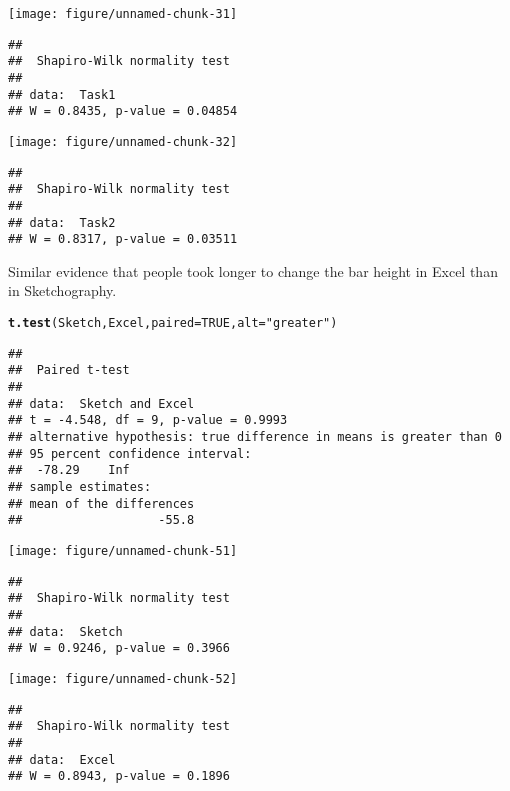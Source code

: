 \documentclass[12pt, twoside, a4paper, openright]{report}\usepackage[]{graphicx}\usepackage[]{color}
\makeatletter
\def\maxwidth{ %
  \ifdim\Gin@nat@width>\linewidth
    \linewidth
  \else
    \Gin@nat@width
  \fi
}
\newcommand{\hlnum}[1]{\textcolor[rgb]{0.686,0.059,0.569}{#1}}%
\newcommand{\hlstr}[1]{\textcolor[rgb]{0.192,0.494,0.8}{#1}}%
\newcommand{\hlstd}[1]{\textcolor[rgb]{0.345,0.345,0.345}{#1}}%
\newcommand{\hlkwc}[1]{\textcolor[rgb]{0.333,0.667,0.333}{#1}}%
\newcommand{\hlkwd}[1]{\textcolor[rgb]{0.737,0.353,0.396}{\textbf{#1}}}%
\newenvironment{kframe}{%
 \def\at@end@of@kframe{}%
 \ifinner\ifhmode%
  \def\at@end@of@kframe{\end{minipage}}%
  \begin{minipage}{\columnwidth}%
 \fi\fi%
 \def\FrameCommand##1{\hskip\@totalleftmargin \hskip-\fboxsep
 \colorbox{shadecolor}{##1}\hskip-\fboxsep
     \hskip-\linewidth \hskip-\@totalleftmargin \hskip\columnwidth}%
 \MakeFramed {\advance\hsize-\width
   \@totalleftmargin\z@ \linewidth\hsize
   \@setminipage}}%
 {\par\unskip\endMakeFramed%
 \at@end@of@kframe}
\newenvironment{knitrout}{}{} %
\makeatother
\begin{document}
\begin{knitrout}
\color{fgcolor}
\texttt{[image: figure/unnamed-chunk-31]} 
\begin{kframe}\begin{verbatim}
## 
## 	Shapiro-Wilk normality test
## 
## data:  Task1
## W = 0.8435, p-value = 0.04854
\end{verbatim}
\end{kframe}
\texttt{[image: figure/unnamed-chunk-32]} 
\begin{kframe}\begin{verbatim}
## 
## 	Shapiro-Wilk normality test
## 
## data:  Task2
## W = 0.8317, p-value = 0.03511
\end{verbatim}
\end{kframe}
\end{knitrout}



Similar evidence that people took longer to change the bar height in Excel than in Sketchography.

\begin{knitrout}
\color{fgcolor}\begin{kframe}
\begin{alltt}
\hlkwd{t.test}\hlstd{(Sketch, Excel,} \hlkwc{paired} \hlstd{=} \hlnum{TRUE}\hlstd{,} \hlkwc{alt} \hlstd{=} \hlstr{"greater"}\hlstd{)}
\end{alltt}
\begin{verbatim}
## 
## 	Paired t-test
## 
## data:  Sketch and Excel
## t = -4.548, df = 9, p-value = 0.9993
## alternative hypothesis: true difference in means is greater than 0
## 95 percent confidence interval:
##  -78.29    Inf
## sample estimates:
## mean of the differences 
##                   -55.8
\end{verbatim}
\end{kframe}
\end{knitrout}


\begin{knitrout}
\color{fgcolor}
\texttt{[image: figure/unnamed-chunk-51]} 
\begin{kframe}\begin{verbatim}
## 
## 	Shapiro-Wilk normality test
## 
## data:  Sketch
## W = 0.9246, p-value = 0.3966
\end{verbatim}
\end{kframe}
\texttt{[image: figure/unnamed-chunk-52]} 
\begin{kframe}\begin{verbatim}
## 
## 	Shapiro-Wilk normality test
## 
## data:  Excel
## W = 0.8943, p-value = 0.1896
\end{verbatim}
\end{kframe}
\end{knitrout}





%

\cleardoublepage




\end{document}
